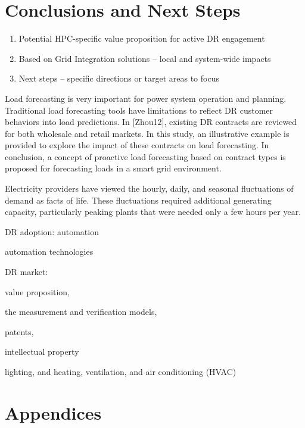 \documentclass{llncs}
\begin{document}
\section{Conclusions and Next Steps}

\begin{enumerate}
\item Potential HPC-specific value proposition for active DR engagement
\item Based on Grid Integration solutions -- local and system-wide impacts
\item Next steps -- specific directions or target areas to focus
\end{enumerate}

Load forecasting is very important for power system operation and planning.
Traditional load forecasting tools have limitations to reflect DR customer
behaviors into load predictions. In [Zhou12], existing DR contracts are
reviewed for both wholesale and retail markets. In this study, an
illustrative example is provided to explore the impact of these contracts on
load forecasting. In conclusion, a concept of proactive load forecasting
based on contract types is proposed for forecasting loads in a smart grid
environment.

Electricity providers have viewed the hourly, daily, and seasonal
fluctuations of demand as facts of life. These fluctuations required
additional generating capacity, particularly peaking plants that were needed
only a few hours per year.

DR adoption: automation

automation technologies

DR market:

value proposition,

the measurement and verification models,

patents,

intellectual property

lighting, and heating, ventilation, and air conditioning (HVAC)


\newpage



%

%
%

%

\section{Appendices}
\end{document}
